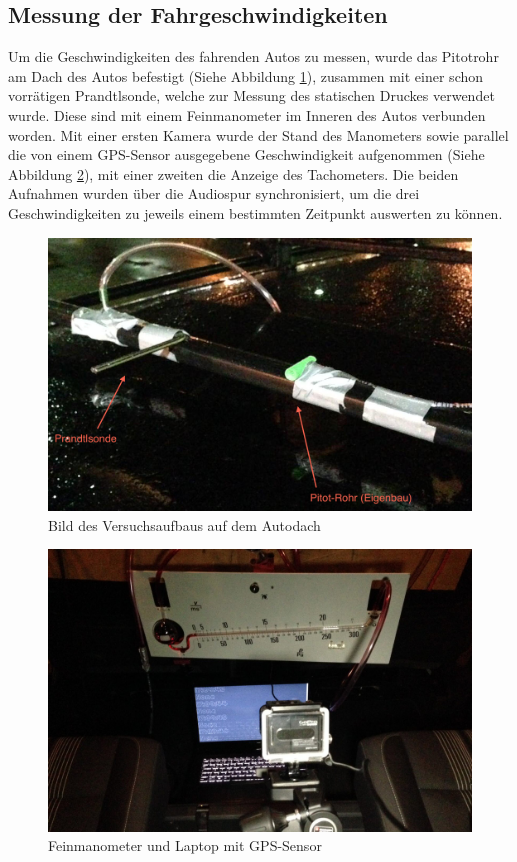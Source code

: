 \subsection{Messung der Fahrgeschwindigkeiten}
Um die Geschwindigkeiten des fahrenden Autos zu messen, wurde das Pitotrohr am Dach des Autos befestigt (Siehe Abbildung \ref{rohre}), zusammen mit einer schon vorrätigen Prandtlsonde, welche zur Messung des statischen Druckes verwendet wurde. Diese sind mit einem Feinmanometer im Inneren des Autos verbunden worden. Mit einer ersten Kamera wurde der Stand des Manometers sowie parallel die von einem GPS-Sensor ausgegebene Geschwindigkeit aufgenommen (Siehe Abbildung \ref{messung}), mit einer zweiten die Anzeige des Tachometers. Die beiden Aufnahmen wurden über die Audiospur synchronisiert, um die drei Geschwindigkeiten zu jeweils einem bestimmten Zeitpunkt auswerten zu können.

\begin{figure}
\centering
	\includegraphics[width=.8\textwidth]{images/rohre-kommentiert.png}
	\caption{Bild des Versuchsaufbaus auf dem Autodach}
	\label{rohre}
\end{figure}

\begin{figure}
\centering
	\includegraphics[width=.8\textwidth]{images/messung.jpg}
	\caption{Feinmanometer und Laptop mit GPS-Sensor}
	\label{messung}
\end{figure}

